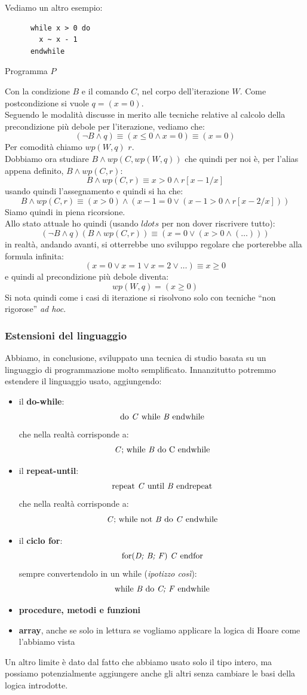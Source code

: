 \documentclass[a4paper,12pt, oneside]{book}
\begin{document}
\begin{esempio}
   Vediamo un altro esempio:
  \begin{listing}[H]
    \begin{lstlisting}
      while x > 0 do
        x ~ x - 1
      endwhile
    \end{lstlisting}
    \caption{Programma $P$}
  \end{listing}
  Con la condizione $B$ e il comando $C$, nel corpo dell'iterazione $W$. Come
  postcondizione si vuole $q=(x=0)$.\\
  Seguendo le modalità discusse in merito alle tecniche relative al calcolo
  della precondizione più debole per l'iterazione, vediamo che:
  \[(\neg B\land q)\equiv (x\leq 0\land x=0)\equiv (x=0)\]
  Per comodità chiamo $wp(W,q)$ $r$.\\ 
  Dobbiamo ora studiare $B\land wp(C,wp(W,q))$ che quindi per noi è, per l'alias
  appena definito, $B\land wp(C,r)$:
  \[B\land wp(C,r)\equiv x>0\land r[x-1/x]\]
  usando quindi l'assegnamento e quindi si ha che:
  \[B\land wp(C,r)\equiv (x>0)\land (x-1=0\lor (x-1>0\land r[x-2/x]))\]
  Siamo quindi in piena ricorsione.\\
  Allo stato attuale ho quindi (usando $ldots$ per non dover riscrivere tutto):
  \[(\neg B\land q)(B\land wp(C,r))\equiv (x=0 \lor(x>0\land(\ldots)))\]
  in realtà, andando avanti, si otterrebbe uno sviluppo regolare che porterebbe
  alla formula infinita:
  \[(x=0\lor x=1\lor x=2\lor \ldots)\equiv x\geq 0\]
  e quindi al precondizione più debole diventa:
  \[wp(W,q)=(x\geq 0)\]
  Si nota quindi come i casi di iterazione si risolvono solo con tecniche ``non
  rigorose'' \textit{ad hoc}.
\end{esempio}
\subsubsection{Estensioni del linguaggio}
Abbiamo, in conclusione, sviluppato una tecnica di studio basata su un
linguaggio di programmazione molto semplificato. Innanzitutto potremmo estendere
il linguaggio usato, aggiungendo:
\begin{itemize}
  \item il \textbf{do-while}:
  \[\mbox{do \textit{C} while \textit{B} endwhile}\]
  che nella realtà corrisponde a:
  \[\mbox{\textit{C}; while \textit{B} do
      \textnormal{C} endwhile}\]
  \item il \textbf{repeat-until}:
  \[\mbox{repeat \textit{C} until \textit{B} endrepeat}\]
  che nella realtà corrisponde a:
  \[\mbox{\textit{C}; while not \textit{B} do
      \textit{C} endwhile}\]
  \item il \textbf{ciclo for}:
  \[\mbox{for(\textit{D; B; F}) \textit{C} endfor} \]
  sempre convertendolo in un while (\textit{ipotizzo così}):
   \[\mbox{while \textit{B} do
      \textit{C; F}  endwhile}\]
  \item \textbf{procedure, metodi e funzioni}
  \item \textbf{array}, anche se solo in lettura se vogliamo applicare la logica
  di Hoare come l'abbiamo vista
\end{itemize}
Un altro limite è dato dal fatto che abbiamo usato solo il tipo intero, ma
possiamo potenzialmente aggiungere anche gli altri senza cambiare le basi della
logica introdotte.
\end{document}
